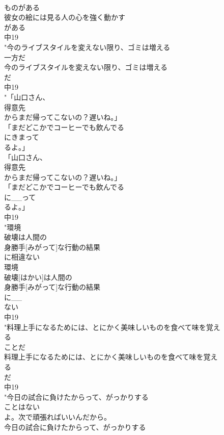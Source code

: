 \documentclass[8pt]{extreport}
\begin{document}
\begin{CJK}{UTF8}{min}
\\	ものがある
\\	彼女の絵には見る人の心を強く動かす
\\	がある
\\	中19
\\	"今のライブスタイルを変えない限り、ゴミは増える
\\	一方だ
\\	今のライブスタイルを変えない限り、ゴミは増える
\\	だ
\\	中19
\\	"「山口さん、
\\	得意先
\\	からまだ帰ってこないの？遅いね。」
\\	「まだどこかでコーヒーでも飲んでる
\\	にきまって
\\	るよ。」
\\	「山口さん、
\\	得意先
\\	からまだ帰ってこないの？遅いね。」
\\	「まだどこかでコーヒーでも飲んでる
\\	に__って
\\	るよ。」
\\	中19
\\	"環境
\\	破壊は人間の
\\	身勝手[みがって]な行動の結果
\\	に相違ない
\\	環境
\\	破壊[はかい]は人間の
\\	身勝手[みがって]な行動の結果
\\	に__
\\	ない
\\	中19
\\	"料理上手になるためには、とにかく美味しいものを食べて味を覚え
\\	る
\\	ことだ
\\	料理上手になるためには、とにかく美味しいものを食べて味を覚え
\\	る
\\	だ
\\	中19
\\	"今日の試合に負けたからって、がっかりする
\\	ことはない
\\	よ。次で頑張ればいいんだから。
\\	今日の試合に負けたからって、がっかりする

\end{CJK}
\end{document}

